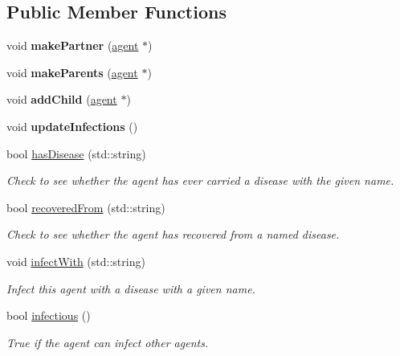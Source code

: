 \subsection*{Public Member Functions}
\begin{DoxyCompactItemize}
\item 
\mbox{\label{classagent_a3d63607b5117bb51096388abb3b56c2d}} 
void {\bfseries make\+Partner} (\mbox{\hyperlink{classagent}{agent}} $\ast$)
\item 
\mbox{\label{classagent_a7185d1236cdaf47e178a73c19a4c5fdd}} 
void {\bfseries make\+Parents} (\mbox{\hyperlink{classagent}{agent}} $\ast$)
\item 
\mbox{\label{classagent_a2457ce46575ff9c204ee3e5cae5e5363}} 
void {\bfseries add\+Child} (\mbox{\hyperlink{classagent}{agent}} $\ast$)
\item 
\mbox{\label{classagent_a7fef7c5b65fb384d74d7606168058212}} 
void {\bfseries update\+Infections} ()
\item 
bool \mbox{\hyperlink{classagent_aab67fe9df4777af3690138fa97d0a3a1}{has\+Disease}} (std\+::string)
\begin{DoxyCompactList}\small\item\em Check to see whether the agent has ever carried a disease with the given name. \end{DoxyCompactList}\item 
bool \mbox{\hyperlink{classagent_a0eee49d52e6c47d7b425bc72cf5caf67}{recovered\+From}} (std\+::string)
\begin{DoxyCompactList}\small\item\em Check to see whether the agent has recovered from a named disease. \end{DoxyCompactList}\item 
void \mbox{\hyperlink{classagent_ac55fabf889e49a48c055c9c495062d5e}{infect\+With}} (std\+::string)
\begin{DoxyCompactList}\small\item\em Infect this agent with a disease with a given name. \end{DoxyCompactList}\item 
bool \mbox{\hyperlink{classagent_ae186a297218e835ac064bf7a329d5b42}{infectious}} ()
\begin{DoxyCompactList}\small\item\em True if the agent can infect other agents. \end{DoxyCompactList}\item 

\end{DoxyCompactItemize}
